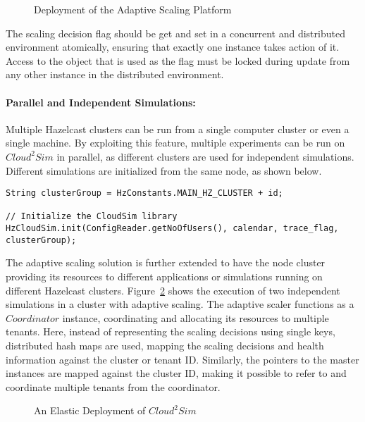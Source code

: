 \begin{figure}[!htbp]
\begin{center}
\end{center}
 \caption{Deployment of the Adaptive Scaling Platform}
 \label{fig:IAS}
\end{figure}

The scaling decision flag should be get and set in a concurrent and distributed environment atomically, ensuring that exactly one instance takes action of it. Access to the object that is used as the flag must be locked during update from any other instance in the distributed environment. 

\paragraph*{Parallel and Independent Simulations:}
Multiple Hazelcast clusters can be run from a single computer cluster or even a single machine. By exploiting this feature, multiple experiments can be run on $Cloud^{2}Sim$ in parallel, as different clusters are used for independent simulations. Different simulations are initialized from the same node, as shown below.

{\fontsize{10}{10}\selectfont
\begin{lstlisting}
String clusterGroup = HzConstants.MAIN_HZ_CLUSTER + id;

// Initialize the CloudSim library
HzCloudSim.init(ConfigReader.getNoOfUsers(), calendar, trace_flag, clusterGroup);
\end{lstlisting}
}
The adaptive scaling solution is further extended to have the node cluster providing its resources to different applications or simulations running on different Hazelcast clusters. Figure~\ref{fig:XIAS} shows the execution of two independent simulations in a cluster with adaptive scaling. The adaptive scaler functions as a $Coordinator$ instance, coordinating and allocating its resources to multiple tenants. Here, instead of representing the scaling decisions using single keys, distributed hash maps are used, mapping the scaling decisions and health information against the cluster or tenant ID. Similarly, the pointers to the master instances are mapped against the cluster ID, making it possible to refer to and coordinate multiple tenants from the coordinator.

\begin{figure}[!htbp]
\begin{center}
\end{center}
 \caption{An Elastic Deployment of $Cloud^{2}Sim$}
 \label{fig:XIAS}
\end{figure}


